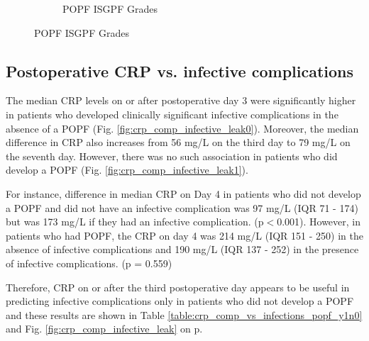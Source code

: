 \begin{figure}[t]
\begin{subfigure}{0.48\textwidth}
		\caption{POPF ISGPF Grades}
		\label{fig:crp_comp_crp_popf_isgps}
	\end{subfigure}
\end{figure}
\hfill

\clearpage

\subsection{Postoperative CRP vs. infective complications}
The median CRP levels on or after postoperative day 3 were significantly higher in patients who developed clinically significant infective complications in the absence of a POPF (Fig. \ref{fig:crp_comp_infective_leak0}). 
Moreover, the median difference in CRP also increases from 56 mg/L on the third day to 79 mg/L on the seventh day. 
However, there was no such association in patients who did develop a POPF (Fig. \ref{fig:crp_comp_infective_leak1}). 

For instance, difference in median CRP on Day 4 in patients who did not develop a POPF and did not have an infective complication was 97 mg/L (IQR 71 - 174) but was 173 mg/L if they had an infective complication. (p$<$0.001). 
However, in patients who had POPF, the CRP on day 4 was 214 mg/L (IQR 151 - 250) in the absence of infective complications and 190 mg/L (IQR 137 - 252) in the presence of infective complications. (p = 0.559)

Therefore, CRP on or after the third postoperative day appears to be useful in predicting infective complications only in patients who did not develop a POPF and these results are shown in Table \ref{table:crp_comp_vs_infections_popf_y1n0} and Fig. \ref{fig:crp_comp_infective_leak} on p\pageref{fig:crp_comp_infective_leak}. 


